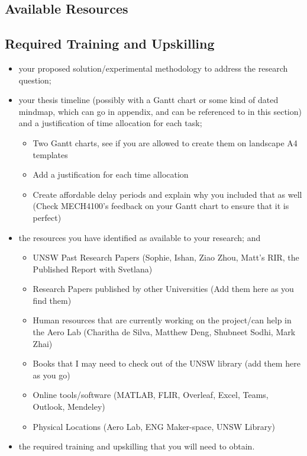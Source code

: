 \subsection{Available Resources}
\subsection{Required Training and Upskilling}
\begin{itemize}
    \item your proposed solution/experimental methodology to address the research question;
    \item your thesis timeline (possibly with a Gantt chart or some kind of dated mindmap, which can go in appendix, and can be referenced to in this section) and a justification of time allocation for each task;
    \begin{itemize}
        \item Two Gantt charts, see if you are allowed to create them on landscape A4 templates
        \item Add a justification for each time allocation
        \item Create affordable delay periods and explain why you included that as well (Check MECH4100's feedback on your Gantt chart to ensure that it is perfect)
    \end{itemize}
    \item the resources you have identified as available to your research; and
    \begin{itemize}
        \item UNSW Past Research Papers (Sophie, Ishan, Ziao Zhou, Matt's RIR, the Published Report with Svetlana)
        \item Research Papers published by other Universities (Add them here as you find them)
        \item Human resources that are currently working on the project/can help in the Aero Lab (Charitha de Silva, Matthew Deng, Shubneet Sodhi, Mark Zhai)
        \item Books that I may need to check out of the UNSW library (add them here as you go)
        \item Online tools/software (MATLAB, FLIR, Overleaf, Excel, Teams, Outlook, Mendeley)
        \item Physical Locations (Aero Lab, ENG Maker-space, UNSW Library)
    \end{itemize}
    \item the required training and upskilling that you will need to obtain.

\end{itemize}
